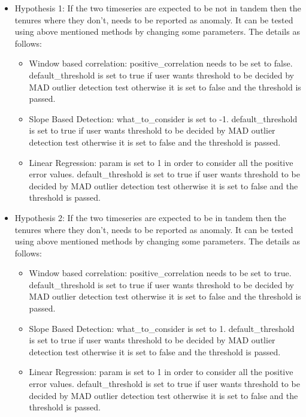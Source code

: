 \begin{itemize}

\item Hypothesis 1: If the two timeseries are expected to be not in tandem then the tenures where they don't, needs to be reported as anomaly. It can be tested using above mentioned methods by changing some parameters. The details as follows:
 \begin{itemize}
   \item Window based correlation: positive\_correlation needs to be set to false. default\_threshold is set to true if user wants threshold to be decided by MAD outlier detection test otherwise it is set to false and the threshold is passed.
    \item Slope Based Detection: what\_to\_consider is set to -1. default\_threshold is set to true if user wants threshold to be decided by MAD outlier detection test otherwise it is set to false and the threshold is passed.
    \item Linear Regression: param is set to 1 in order to consider all the positive error values. default\_threshold is set to true if user wants threshold to be decided by MAD outlier detection test otherwise it is set to false and the threshold is passed.
  \end{itemize}

\item Hypothesis 2: If the two timeseries are expected to be in tandem then the tenures where they don't, needs to be reported as anomaly. It can be tested using above mentioned methods by changing some parameters. The details as follows:
  \begin{itemize}
   \item Window based correlation: positive\_correlation needs to be set to true. default\_threshold is set to true if user wants threshold to be decided by MAD outlier detection test otherwise it is set to false and the threshold is passed.
    \item Slope Based Detection: what\_to\_consider is set to 1. default\_threshold is set to true if user wants threshold to be decided by MAD outlier detection test otherwise it is set to false and the threshold is passed.
    \item Linear Regression: param is set to 1 in order to consider all the positive error values. default\_threshold is set to true if user wants threshold to be decided by MAD outlier detection test otherwise it is set to false and the threshold is passed.
  \end{itemize}
  

\end{itemize}
